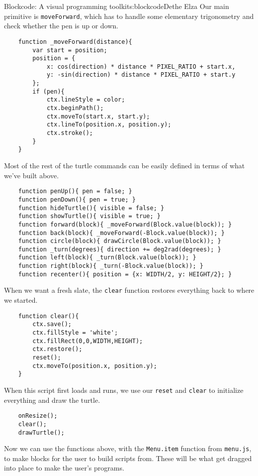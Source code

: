 \begin{aosachapter}{Blockcode: A visual programming toolkit}{s:blockcode}{Dethe Elza}
Our main primitive is \texttt{moveForward}, which has to handle some
elementary trigonometry and check whether the pen is up or down.

\begin{verbatim}
    function _moveForward(distance){
        var start = position;
        position = {
            x: cos(direction) * distance * PIXEL_RATIO + start.x,
            y: -sin(direction) * distance * PIXEL_RATIO + start.y
        };
        if (pen){
            ctx.lineStyle = color;
            ctx.beginPath();
            ctx.moveTo(start.x, start.y);
            ctx.lineTo(position.x, position.y);
            ctx.stroke();
        }
    }
\end{verbatim}

Most of the rest of the turtle commands can be easily defined in terms
of what we've built above.

\begin{verbatim}
    function penUp(){ pen = false; }
    function penDown(){ pen = true; }
    function hideTurtle(){ visible = false; }
    function showTurtle(){ visible = true; }
    function forward(block){ _moveForward(Block.value(block)); }
    function back(block){ _moveForward(-Block.value(block)); }
    function circle(block){ drawCircle(Block.value(block)); }
    function _turn(degrees){ direction += deg2rad(degrees); }
    function left(block){ _turn(Block.value(block)); }
    function right(block){ _turn(-Block.value(block)); }
    function recenter(){ position = {x: WIDTH/2, y: HEIGHT/2}; }
\end{verbatim}

When we want a fresh slate, the \texttt{clear} function restores
everything back to where we started.

\begin{verbatim}
    function clear(){
        ctx.save();
        ctx.fillStyle = 'white';
        ctx.fillRect(0,0,WIDTH,HEIGHT);
        ctx.restore();
        reset();
        ctx.moveTo(position.x, position.y);
    }
\end{verbatim}

When this script first loads and runs, we use our \texttt{reset} and
\texttt{clear} to initialize everything and draw the turtle.

\begin{verbatim}
    onResize();
    clear();
    drawTurtle();
\end{verbatim}

Now we can use the functions above, with the \texttt{Menu.item} function
from \texttt{menu.js}, to make blocks for the user to build scripts
from. These will be what get dragged into place to make the user's
programs.


\end{aosachapter}
